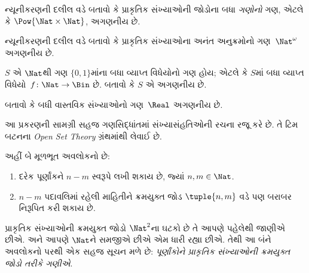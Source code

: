 \begin{prob}
ન્યૂનીકરણની દલીલ વડે બતાવો કે પ્રાકૃતિક સંખ્યાઓની જોડોના બધા
\emph{ગણોનો} ગણ, એટલે કે $\Pow{\Nat \times \Nat}$, અગણનીય છે.
\end{prob}

\begin{prob}
ન્યૂનીકરણની દલીલ વડે બતાવો કે પ્રાકૃતિક સંખ્યાઓના અનંત
અનુક્રમોનો ગણ~$\Nat^\omega$ અગણનીય છે.
\end{prob}


\begin{prob}
$S$ એ $\Nat$થી ગણ $\{0,1\}$માંના બધા વ્યાપ્ત વિધેયોનો ગણ હોય;
એટલે કે $S$માં બધા વ્યાપ્ત વિધેયો~$f \colon \Nat \to \Bin$ છે.
બતાવો કે $S$ એ અગણનીય છે.
\end{prob}

\begin{prob}
બતાવો કે બધી વાસ્તવિક સંખ્યાઓનો ગણ~$\Real$ અગણનીય છે.
\end{prob}
\endgroup


\OLEndChapterHook
\endgroup


\begingroup
\makeatletter{}\makeatother

\label{guunit:OLP-0041}


\begin{editorial}
આ પ્રકરણની સામગ્રી સહજ ગણસિદ્ધાંતમાં સંખ્યાસંહતિઓની રચના
રજૂ કરે છે. તે ટિમ બટનના \emph{Open Set Theory} ગ્રંથમાંથી લેવાઈ છે.
\end{editorial}

\begingroup
\makeatletter{}\makeatother

\label{guunit:OLP-0042}


અહીં બે મૂળભૂત અવલોકનો છે:
  \begin{enumerate}
    \item દરેક પૂર્ણાંકને $n - m$ સ્વરૂપે લખી શકાય છે, જ્યાં $n, m \in\Nat$.
    \item $n - m$ પદાવલિમાં રહેલી માહિતીને ક્રમયુક્ત જોડ $\tuple{n, m}$ વડે પણ બરાબર નિરૂપિત કરી શકાય છે.
  \end{enumerate}
પ્રાકૃતિક સંખ્યાઓની ક્રમયુક્ત જોડો $\Nat^2$ના ઘટકો છે તે આપણે
પહેલેથી જાણીએ છીએ. અને આપણે $\Nat$ને સમજીએ છીએ એમ ધારી રહ્યા છીએ.
તેથી આ બંને અવલોકનો પરથી એક સહજ સૂચન મળે છે: \emph{પૂર્ણાંકોને
પ્રાકૃતિક સંખ્યાઓની ક્રમયુક્ત જોડો તરીકે ગણીએ}.

